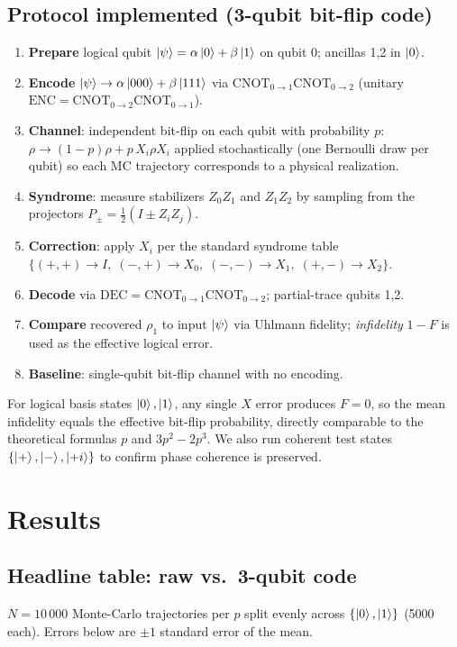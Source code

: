 \documentclass[11pt]{article}
\begin{document}
\subsection{Protocol implemented (3-qubit bit-flip code)}
\label{sec:protocol}
\begin{enumerate}
    \item \textbf{Prepare} logical qubit
    $\ket{\psi}=\alpha\ket{0}+\beta\ket{1}$ on qubit 0; ancillas 1,2 in
    $\ket{0}$.
    \item \textbf{Encode}
    $\ket{\psi}\to\alpha\ket{000}+\beta\ket{111}$ via
    $\mathrm{CNOT}_{0\to 1}\mathrm{CNOT}_{0\to 2}$ (unitary
    $\mathrm{ENC}=\mathrm{CNOT}_{0\to 2}\mathrm{CNOT}_{0\to 1}$).
    \item \textbf{Channel}: independent bit-flip on each qubit with
    probability $p$: $\rho\to (1-p)\rho + p\, X_{i}\rho X_{i}$ applied
    stochastically (one Bernoulli draw per qubit) so each MC trajectory
    corresponds to a physical realization.
    \item \textbf{Syndrome}: measure stabilizers $Z_{0}Z_{1}$ and
    $Z_{1}Z_{2}$ by sampling from the projectors
    $P_{\pm}=\tfrac{1}{2}(I\pm Z_{i}Z_{j})$.
    \item \textbf{Correction}: apply $X_{i}$ per the standard syndrome
    table
    $\{(+,+)\!\to\!I,\;(-,+)\!\to\!X_{0},\;(-,-)\!\to\!X_{1},\;(+,-)\!\to\!X_{2}\}$.
    \item \textbf{Decode} via $\mathrm{DEC}=\mathrm{CNOT}_{0\to
    1}\mathrm{CNOT}_{0\to 2}$; partial-trace qubits 1,2.
    \item \textbf{Compare} recovered $\rho_{1}$ to input $\ket{\psi}$ via
    Uhlmann fidelity; \emph{infidelity} $1-F$ is used as the effective
    logical error.
    \item \textbf{Baseline}: single-qubit bit-flip channel with no
    encoding.
\end{enumerate}
For logical basis states $\ket{0},\ket{1}$, any single $X$ error produces
$F=0$, so the mean infidelity equals the effective bit-flip probability,
directly comparable to the theoretical formulas $p$ and $3p^{2}-2p^{3}$.
We also run coherent test states
$\{\ket{+},\ket{-},\ket{{+}i}\}$ to confirm phase coherence is preserved.

\section{Results}
\label{sec:results}

\subsection{Headline table: raw vs.\ 3-qubit code}
$N=10\,000$ Monte-Carlo trajectories per $p$ split evenly across
$\{\ket{0},\ket{1}\}$ (5000 each). Errors below are $\pm 1$ standard error
of the mean.
\end{document}
